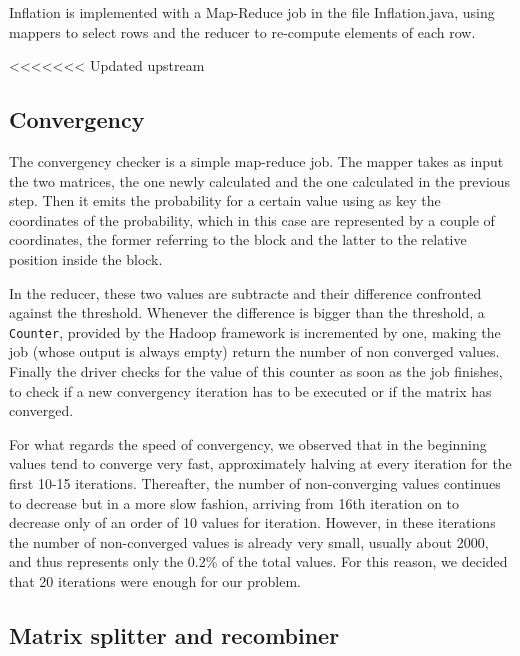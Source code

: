 Inflation is implemented with a Map-Reduce job in the file Inflation.java,
using mappers to select rows and the reducer to re-compute elements of each
row.

<<<<<<< Updated upstream
\subsection{Convergency}
The convergency checker is a simple map-reduce job. The mapper takes as input the two matrices, the one 
newly calculated and the one calculated in the previous step. 
Then it emits the probability for a certain value using as key the coordinates of the probability, which
in this case are represented by a couple of coordinates, the former referring to the block and the latter to the
relative position inside the block.

In the reducer, these two values are subtracte and their difference confronted against the threshold. Whenever 
the difference is bigger than the threshold, a \texttt{Counter}, provided by the Hadoop framework is incremented by one,
making the job (whose output is always empty) return the number of non converged values.
Finally the driver checks for the value of this counter as soon as the job finishes, to check if a new convergency iteration
has to be executed or if the matrix has converged.

For what regards the speed of convergency, we observed that in the beginning values tend to converge very fast, approximately halving at every iteration for the first 10-15 iterations. Thereafter, the number of non-converging values continues to decrease
but in a more slow fashion, arriving from 16th iteration on to decrease only of an order of 10 values for iteration.
However, in these iterations the number of non-converged values is already very small, usually about 2000, and thus 
represents only the 0.2\% of the total values.
For this reason, we decided that 20 iterations were enough for our problem.

\subsection{Matrix splitter and recombiner}
\label{splitter}


